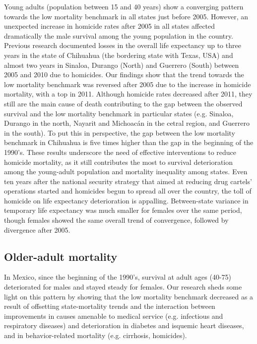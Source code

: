 \documentclass[11.5pt]{article}
\begin{document}
\begin{spacing}{1.5}
Young adults (population between 15 and 40 years) show a converging pattern towards the low mortality benchmark in all states just before 2005. However, an unexpected increase in homicide rates after 2005 in all states affected dramatically the male survival among the young population in the country. Previous research documented losses in the overall life expectancy up to three years in the state of Chihuahua (the bordering state with Texas, USA) and almost two years in Sinaloa, Durango (North) and Guerrero (South) between 2005 and 2010 due to homicides\citep{Aburto2015}. Our findings show that the trend towards the low mortality benchmark was reversed after 2005 due to the increase in homicide mortality, with a top in 2011. Although homicide rates decreased after 2011, they still are the main cause of death contributing to the gap between the observed survival and the low mortality benchmark in particular states (e.g. Sinaloa, Durango in the north, Nayarit and Michoac\'an in the cetral region, and Guerrero in the south). To put this in perspective, the gap between the low mortality benchmark in Chihuahua is five times higher than the gap in the beginning of the 1990's. 
These results underscore the need of effective interventions to reduce homicide mortality, as it still contributes the most to survival deterioration among the young-adult population and mortality inequality among states. Even ten years after the national security strategy that aimed at reducing drug cartels' operations started and homicides begun to spread all over the country\citep{espinal2015analysis}, the toll of homicide on life expectancy deterioration is appalling. Between-state variance in temporary life expectancy was much smaller for females over the same period, though females showed the same overall trend of convergence, followed by divergence after 2005.

\subsection*{Older-adult mortality}
In Mexico, since the beginning of the 1990's, survival at adult ages (40-75) deteriorated for males and stayed steady for females. Our research sheds some light on this pattern by showing that the low mortality benchmark decreased as a result of offsetting state-mortality trends and the interaction between improvements in causes amenable to medical service (e.g. infectious and respiratory diseases) and deterioration in diabetes and isquemic heart diseases, and in behavior-related mortality (e.g. cirrhosis, homicides). 


\end{spacing}
\end{document}
